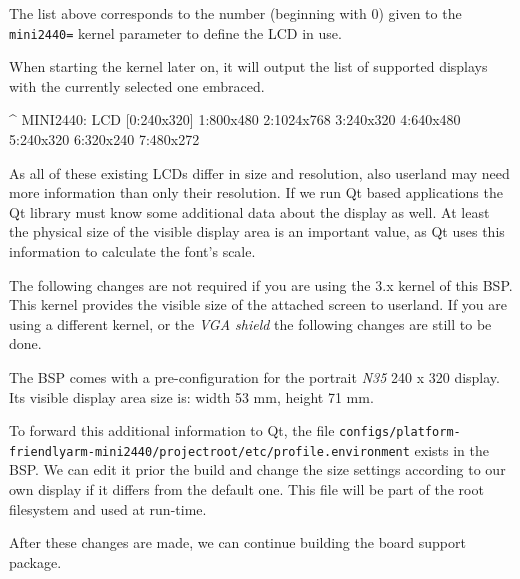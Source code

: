 The list above corresponds to the number (beginning with 0) given to the
\texttt{mini2440=} kernel parameter to define the LCD in use.

When starting the kernel later on, it will output the list of supported displays
with the currently selected one embraced.

\begin{ptxshell}[escapechar=|]{^}
MINI2440: LCD [0:240x320] 1:800x480 2:1024x768 3:240x320 4:640x480 5:240x320 6:320x240 7:480x272
\end{ptxshell}

As all of these existing LCDs differ in size and resolution, also userland may
need more information than only their resolution. If we run Qt based applications
the Qt library must know some additional data about the display as well. At
least the physical size of the visible display area is an important value, as
Qt uses this information to calculate the font's scale.

\begin{important}
The following changes are not required if you are using the 3.x kernel of
this BSP. This kernel provides the visible size of the attached screen to userland.
If you are using a different kernel, or the \textit{VGA shield} the following changes
are still to be done.
\end{important}

The BSP comes with a pre-configuration for the portrait \textit{N35}
240 x 320 display. Its visible display area size is: width 53 mm, height 71 mm.

To forward this additional information to Qt, the file
\texttt{configs/platform-friendlyarm-mini2440/projectroot/etc/profile.environment}
exists in the BSP. We can edit it prior the build and change the size settings
according to our own display if it differs from the default one. This file will
be part of the root filesystem and used at run-time.

After these changes are made, we can continue building the board support
package.
